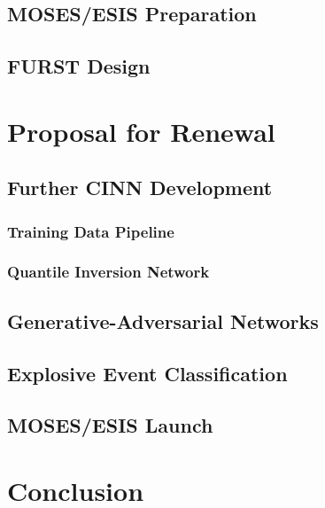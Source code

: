\documentclass[10pt,letterpaper]{article}
\begin{document}
		\subsection{MOSES/ESIS Preparation}
		
		\subsection{FURST Design}
	
	\section{Proposal for Renewal}
	
		\subsection{Further CINN Development}
		
			\subsubsection{Training Data Pipeline}
		
			\subsubsection{Quantile Inversion Network}
			
			\subsection{Generative-Adversarial Networks}	\label{sec_gan}
		
		\subsection{Explosive Event Classification}
		
			
		
		\subsection{MOSES/ESIS Launch}

	
	\section{Conclusion}
	\begin{landscape}
		
	\end{landscape}
	
\end{document}
